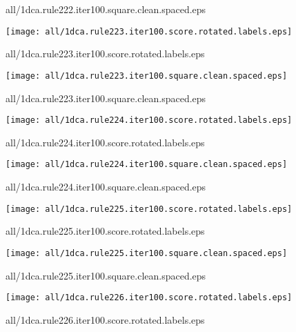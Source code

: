 \documentclass{article}
\begin{document}
{\footnotesize all/1dca.rule222.iter100.square.clean.spaced.eps}
\begin{center}
\begin{minipage}{\textwidth}
\texttt{[image: all/1dca.rule223.iter100.score.rotated.labels.eps]}
\end{minipage}
\end{center}
{\footnotesize all/1dca.rule223.iter100.score.rotated.labels.eps}
\begin{center}
\begin{minipage}{\textwidth}
\texttt{[image: all/1dca.rule223.iter100.square.clean.spaced.eps]}
\end{minipage}
\end{center}
{\footnotesize all/1dca.rule223.iter100.square.clean.spaced.eps}
\begin{center}
\begin{minipage}{\textwidth}
\texttt{[image: all/1dca.rule224.iter100.score.rotated.labels.eps]}
\end{minipage}
\end{center}
{\footnotesize all/1dca.rule224.iter100.score.rotated.labels.eps}
\begin{center}
\begin{minipage}{\textwidth}
\texttt{[image: all/1dca.rule224.iter100.square.clean.spaced.eps]}
\end{minipage}
\end{center}
{\footnotesize all/1dca.rule224.iter100.square.clean.spaced.eps}
\begin{center}
\begin{minipage}{\textwidth}
\texttt{[image: all/1dca.rule225.iter100.score.rotated.labels.eps]}
\end{minipage}
\end{center}
{\footnotesize all/1dca.rule225.iter100.score.rotated.labels.eps}
\begin{center}
\begin{minipage}{\textwidth}
\texttt{[image: all/1dca.rule225.iter100.square.clean.spaced.eps]}
\end{minipage}
\end{center}
{\footnotesize all/1dca.rule225.iter100.square.clean.spaced.eps}
\begin{center}
\begin{minipage}{\textwidth}
\texttt{[image: all/1dca.rule226.iter100.score.rotated.labels.eps]}
\end{minipage}
\end{center}
{\footnotesize all/1dca.rule226.iter100.score.rotated.labels.eps}
\end{document}
